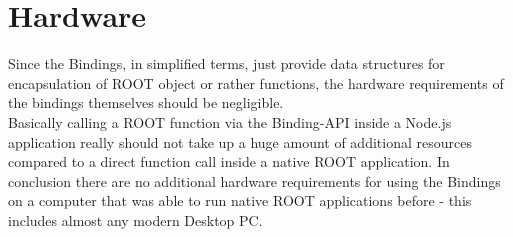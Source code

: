 \section{Hardware}
Since the Bindings, in simplified terms, just provide data structures for encapsulation of ROOT object or rather functions, the hardware requirements of the bindings themselves should be negligible.\\
Basically calling a ROOT function via the Binding-API inside a Node.js application really should not take up a huge amount of additional resources compared to a direct function call inside a native ROOT application.
In conclusion there are no additional hardware requirements for using the Bindings on a computer that was able to run native ROOT applications before - this includes almost any modern Desktop PC.
